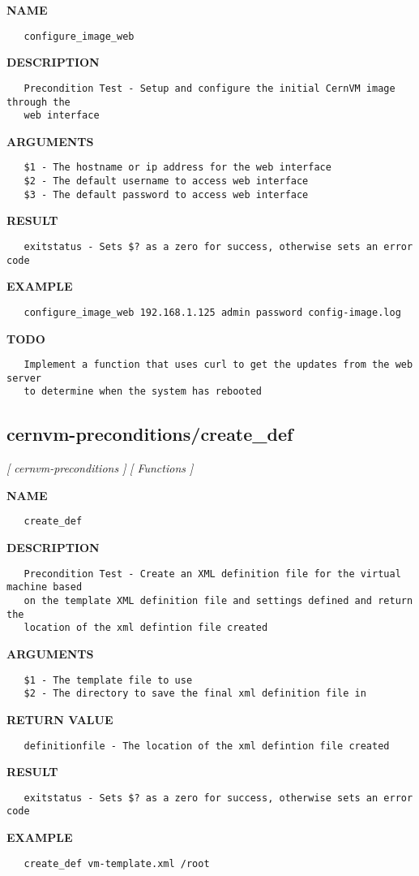 \label{ch:robo0}
\label{ch:cernvm_preconditions_configure_image_web}
\textbf{NAME}
\begin{verbatim}
   configure_image_web
\end{verbatim}
\textbf{DESCRIPTION}
\begin{verbatim}
   Precondition Test - Setup and configure the initial CernVM image through the
   web interface
\end{verbatim}
\textbf{ARGUMENTS}
\begin{verbatim}
   $1 - The hostname or ip address for the web interface
   $2 - The default username to access web interface
   $3 - The default password to access web interface
\end{verbatim}
\textbf{RESULT}
\begin{verbatim}
   exitstatus - Sets $? as a zero for success, otherwise sets an error code
\end{verbatim}
\textbf{EXAMPLE}
\begin{verbatim}
   configure_image_web 192.168.1.125 admin password config-image.log
\end{verbatim}
\textbf{TODO}
\begin{verbatim}
   Implement a function that uses curl to get the updates from the web server 
   to determine when the system has rebooted
\end{verbatim}
\newpage
\subsection{cernvm-preconditions/create\_def}
\textsl{[ cernvm-preconditions ]}
\textsl{[ Functions ]}

\label{ch:robo1}
\label{ch:cernvm_preconditions_create_def}
\textbf{NAME}
\begin{verbatim}
   create_def
\end{verbatim}
\textbf{DESCRIPTION}
\begin{verbatim}
   Precondition Test - Create an XML definition file for the virtual machine based
   on the template XML definition file and settings defined and return the
   location of the xml defintion file created
\end{verbatim}
\textbf{ARGUMENTS}
\begin{verbatim}
   $1 - The template file to use
   $2 - The directory to save the final xml definition file in
\end{verbatim}
\textbf{RETURN VALUE}
\begin{verbatim}
   definitionfile - The location of the xml defintion file created
\end{verbatim}
\textbf{RESULT}
\begin{verbatim}
   exitstatus - Sets $? as a zero for success, otherwise sets an error code
\end{verbatim}
\textbf{EXAMPLE}
\begin{verbatim}
   create_def vm-template.xml /root
\end{verbatim}
\newpage

